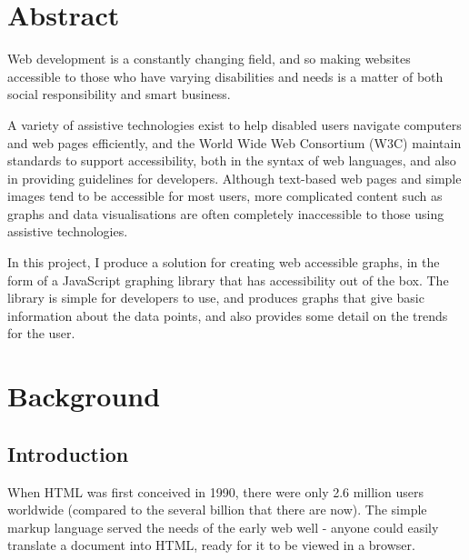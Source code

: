 \documentclass[ %
                    author={Aleena Baig},
                supervisor={Dr Simon Lock},
                    degree={BSc},
                     title={On Making Web Accessible Graphs},
                  subtitle={},
                      year={2019} ]{dissertation}
\begin{document}
\frontmatter


\makedecl

\tableofcontents


\setlength{\parskip}{1em}

\chapter{Abstract}

Web development is a constantly changing field, and so making websites accessible to those who have varying disabilities and needs is a matter of both social responsibility and smart business.

A variety of assistive technologies exist to help disabled users navigate computers and web pages efficiently, and the World Wide Web Consortium (W3C) maintain standards to support accessibility, both in the syntax of web languages, and also in providing guidelines for developers. Although text-based web pages and simple images tend to be accessible for most users, more complicated content such as graphs and data visualisations are often completely inaccessible to those using assistive technologies.

In this project, I produce a solution for creating web accessible graphs, in the form of a JavaScript graphing library that has accessibility out of the box. The library is simple for developers to use, and produces graphs that give basic information about the data points, and also provides some detail on the trends for the user.


\mainmatter

\chapter{Background}

\section{Introduction}
When HTML was first conceived in 1990, there were only 2.6 million users worldwide (compared to the several billion that there are now).\cite{ourworldindata:internet} The simple markup language served the needs of the early web well - anyone could easily translate a document into HTML, ready for it to be viewed in a browser.
\end{document}
